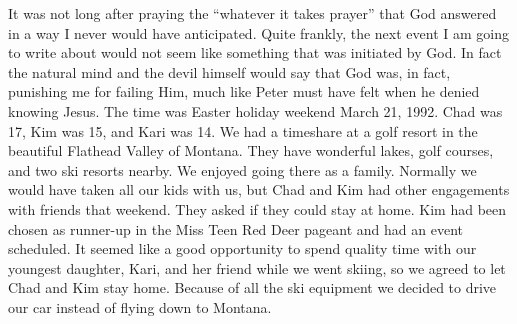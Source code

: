 \documentclass[twoside, 12pt]{book}
\begin{document}
It was not long after praying the “whatever it takes prayer” that God answered in a way I never would have anticipated. Quite frankly, the next event I am going to write about would not seem like something that was initiated by God. In fact the natural mind and the devil himself would say that God was, in fact, punishing me for failing Him, much like Peter must have felt when he denied knowing Jesus. The time was Easter holiday weekend March 21, 1992. Chad was 17, Kim was 15, and Kari was 14. We had a timeshare at a golf resort in the beautiful Flathead Valley of Montana. They have wonderful lakes, golf courses, and two ski resorts nearby. We enjoyed going there as a family. Normally we would have taken all our kids with us, but Chad and Kim had other engagements with friends that weekend. They asked if they could stay at home. Kim had been chosen as runner-up in the Miss Teen Red Deer pageant and had an event scheduled. It seemed like a good opportunity to spend quality time with our youngest daughter, Kari, and her friend while we went skiing, so we agreed to let Chad and Kim stay home. Because of all the ski equipment we decided to drive our car instead of flying down to Montana. 
\end{document}
